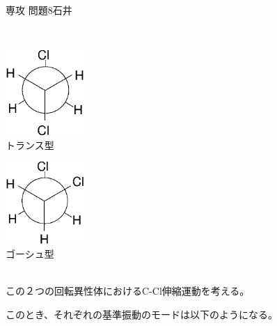 \documentclass[fleqn]{jbook}
\begin{document}
\begin{answer}{専攻 問題8}{石井}
\begin{subanswers}
\begin{subsubanswers}
\end{subsubanswers}
\SubAnswer 
\begin{subsubanswers}
\SubSubAnswer
~\\
\begin{minipage}{.45\linewidth}
\begin{center}
\includegraphics[width=3cm]{1999phy8-4.eps}\\
トランス型
\end{center}
\end{minipage}
\begin{minipage}{.45\linewidth}
\begin{center}
\includegraphics[width=3cm]{1999phy8-5.eps}\\
ゴーシュ型
\end{center}
\end{minipage}\\

\SubSubAnswer この２つの回転異性体におけるC-Cl伸縮運動を考える。

このとき、それぞれの基準振動のモードは以下のようになる。\\


\end{subsubanswers}
\end{subanswers}
\end{answer}
\end{document}
